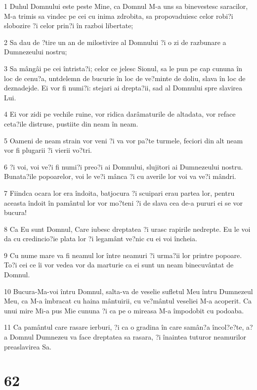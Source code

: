 \par 1 Duhul Domnului este peste Mine, ca Domnul M-a uns sa binevestesc saracilor, M-a trimis sa vindec pe cei cu inima zdrobita, sa propovaduiesc celor robi?i slobozire ?i celor prin?i în razboi libertate;
\par 2 Sa dau de ?tire un an de milostivire al Domnului ?i o zi de razbunare a Dumnezeului nostru;
\par 3 Sa mângâi pe cei întrista?i; celor ce jelesc Sionul, sa le pun pe cap cununa în loc de cenu?a, untdelemn de bucurie în loc de ve?minte de doliu, slava în loc de deznadejde. Ei vor fi numi?i: stejari ai drepta?ii, sad al Domnului spre slavirea Lui.
\par 4 Ei vor zidi pe vechile ruine, vor ridica darâmaturile de altadata, vor reface ceta?ile distruse, pustiite din neam în neam.
\par 5 Oameni de neam strain vor veni ?i va vor pa?te turmele, feciori din alt neam vor fi plugarii ?i vierii vo?tri.
\par 6 ?i voi, voi ve?i fi numi?i preo?i ai Domnului, slujitori ai Dumnezeului nostru. Bunata?ile popoarelor, voi le ve?i mânca ?i cu averile lor voi va ve?i mândri.
\par 7 Fiindca ocara lor era îndoita, batjocura ?i scuipari erau partea lor, pentru aceasta îndoit în pamântul lor vor mo?teni ?i de slava cea de-a pururi ei se vor bucura!
\par 8 Ca Eu sunt Domnul, Care iubesc dreptatea ?i urasc rapirile nedrepte. Eu le voi da cu credincio?ie plata lor ?i legamânt ve?nic cu ei voi încheia.
\par 9 Cu nume mare va fi neamul lor între neamuri ?i urma?ii lor printre popoare. To?i cei ce îi vor vedea vor da marturie ca ei sunt un neam binecuvântat de Domnul.
\par 10 Bucura-Ma-voi întru Domnul, salta-va de veselie sufletul Meu întru Dumnezeul Meu, ca M-a îmbracat cu haina mântuirii, cu ve?mântul veseliei M-a acoperit. Ca unui mire Mi-a pus Mie cununa ?i ca pe o mireasa M-a împodobit cu podoaba.
\par 11 Ca pamântul care rasare ierburi, ?i ca o gradina în care samân?a încol?e?te, a?a Domnul Dumnezeu va face dreptatea sa rasara, ?i înaintea tuturor neamurilor preaslavirea Sa.

\chapter{62}

